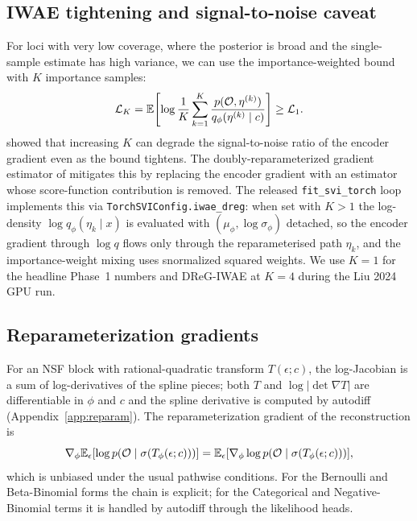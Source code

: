 \subsection{IWAE tightening and signal-to-noise caveat}
\label{ssec:iwae}
For loci with very low coverage, where the posterior is broad and the single-sample estimate has high variance, we can use the importance-weighted bound \citep{burda2016iwae} with $K$ importance samples:
\begin{equation}
\mathcal{L}_K = \mathbb{E}\!\left[\log\frac{1}{K}\sum_{k=1}^K \frac{p(\mathcal{O},\eta^{(k)})}{q_\phi(\eta^{(k)}\mid c)}\right] \ge \mathcal{L}_1.
\end{equation}
\citet{rainforth2018iwaeSNR} showed that increasing $K$ can degrade the signal-to-noise ratio of the encoder gradient even as the bound tightens. The doubly-reparameterized gradient estimator of \citet{tucker2019dreg} mitigates this by replacing the encoder gradient with an estimator whose score-function contribution is removed. The released \texttt{fit\_svi\_torch} loop implements this via \texttt{TorchSVIConfig.iwae\_dreg}: when set with $K>1$ the log-density $\log q_\phi(\eta_k\mid x)$ is evaluated with $(\mu_\phi,\log\sigma_\phi)$ detached, so the encoder gradient through $\log q$ flows only through the reparameterised path $\eta_k$, and the importance-weight mixing uses snormalized squared weights. We use $K=1$ for the headline Phase~1 numbers and DReG-IWAE at $K=4$ during the Liu 2024 GPU run.

\subsection{Reparameterization gradients}
For an NSF block with rational-quadratic transform $T(\epsilon;c)$, the log-Jacobian is a sum of log-derivatives of the spline pieces; both $T$ and $\log|\det\nabla T|$ are differentiable in $\phi$ and $c$ and the spline derivative is computed by autodiff (Appendix~\ref{app:reparam}). The reparameterization gradient of the reconstruction is
\begin{equation}
\nabla_\phi \mathbb{E}_{\epsilon}[\log p(\mathcal{O}\mid\sigma(T_\phi(\epsilon;c)))] = \mathbb{E}_\epsilon[\nabla_\phi \log p(\mathcal{O}\mid\sigma(T_\phi(\epsilon;c)))],
\end{equation}
which is unbiased under the usual pathwise conditions. For the Bernoulli and Beta-Binomial forms the chain is explicit; for the Categorical and Negative-Binomial terms it is handled by autodiff through the likelihood heads.

